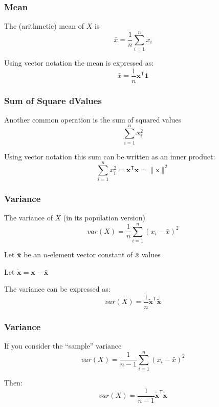\documentclass[12pt]{beamer}\usepackage[]{graphicx}\usepackage[]{color}
\begin{document}

\begin{frame}
\frametitle{Mean}

The (arithmetic) mean of $X$ is
$$
\bar{x} = \frac{1}{n} \sum_{i=1}^{n} x_i
$$

\pause
\bigskip
Using vector notation the mean is expressed as:
$$
\bar{x} = \frac{1}{n} \mathbf{x^{\mathsf{T}} 1}
$$

\end{frame}


\begin{frame}
\frametitle{Sum of Square dValues}

Another common operation is the sum of squared values
$$
\sum_{i=1}^{n} x_{i}^{2}
$$

\pause
\bigskip
Using vector notation this sum can be written as an inner product:
$$
\sum_{i=1}^{n} x_{i}^{2} = \mathbf{x^{\mathsf{T}} x} = \| \mathsf{x} \|^2
$$

\end{frame}


\begin{frame}
\frametitle{Variance}

The variance of $X$ {\lolit (in its population version)}
$$
var(X) = \frac{1}{n} \sum_{i=1}^{n} (x_i - \bar{x})^2
$$

\bi
  \item Let $\mathbf{\bar{x}}$ be an $n$-element vector constant of $\bar{x}$ values
  \item Let $\mathbf{\tilde{x}} = \mathbf{x} - \mathbf{\bar{x}}$
\ei

\pause
\bigskip
The variance can be expressed as:
$$
var(X) = \frac{1}{n} \mathbf{\tilde{x}^{\mathsf{T}} \tilde{x}}
$$

\end{frame}


\begin{frame}
\frametitle{Variance}

If you consider the ``sample'' variance
$$
var(X) = \frac{1}{n-1} \sum_{i=1}^{n} (x_i - \bar{x})^2
$$

\bigskip
Then:
$$
var(X) = \frac{1}{n-1} \mathbf{\tilde{x}^{\mathsf{T}} \tilde{x}}
$$

\end{frame}
\end{document}
